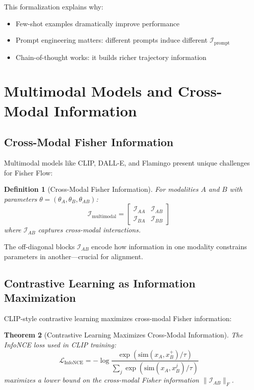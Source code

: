 \documentclass[11pt]{article}
\newtheorem{theorem}{Theorem}
\newtheorem{definition}[theorem]{Definition}
\begin{document}
This formalization explains why:
\begin{itemize}
\item Few-shot examples dramatically improve performance
\item Prompt engineering matters: different prompts induce different $\mathcal{I}_{\text{prompt}}$
\item Chain-of-thought works: it builds richer trajectory information
\end{itemize}

\section{Multimodal Models and Cross-Modal Information}

\subsection{Cross-Modal Fisher Information}

Multimodal models like CLIP, DALL-E, and Flamingo present unique challenges for Fisher Flow:

\begin{definition}[Cross-Modal Fisher Information]
For modalities $A$ and $B$ with parameters $\theta = (\theta_A, \theta_B, \theta_{AB})$:
\begin{equation}
\mathcal{I}_{\text{multimodal}} = \begin{bmatrix}
\mathcal{I}_{AA} & \mathcal{I}_{AB} \\
\mathcal{I}_{BA} & \mathcal{I}_{BB}
\end{bmatrix}
\end{equation}
where $\mathcal{I}_{AB}$ captures cross-modal interactions.
\end{definition}

The off-diagonal blocks $\mathcal{I}_{AB}$ encode how information in one modality constrains parameters in another—crucial for alignment.

\subsection{Contrastive Learning as Information Maximization}

CLIP-style contrastive learning maximizes cross-modal Fisher information:

\begin{theorem}[Contrastive Learning Maximizes Cross-Modal Information]
The InfoNCE loss used in CLIP training:
\begin{equation}
\mathcal{L}_{\text{InfoNCE}} = -\log \frac{\exp(\text{sim}(x_A, x_B^+)/\tau)}{\sum_j \exp(\text{sim}(x_A, x_B^j)/\tau)}
\end{equation}
maximizes a lower bound on the cross-modal Fisher information $\|\mathcal{I}_{AB}\|_F$.
\end{theorem}
\end{document}
